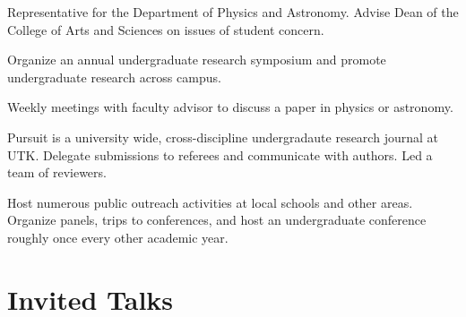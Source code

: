 \documentclass[letterpaper]{deedy-resume} %
\begin{document}
Representative for the Department of Physics and Astronomy. Advise Dean of the College of Arts and Sciences
on issues of student concern.
\sectionspace %



Organize an annual undergraduate research symposium and promote undergraduate research across campus.
\sectionspace %



Weekly meetings with faculty advisor to discuss a paper in physics or astronomy.
\sectionspace %

\protected{}

Pursuit is a university wide, cross-discipline undergradaute research journal at UTK. Delegate submissions to referees and communicate with authors. Led a team of reviewers.
\sectionspace %



Host numerous public outreach activities at local schools and other areas. Organize panels, trips to conferences, and host an undergraduate conference roughly once every other academic year.
\sectionspace %




\section{Invited Talks}
\end{document}
